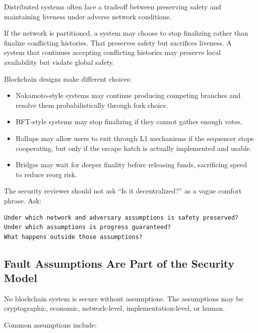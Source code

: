 Distributed systems often face a tradeoff between preserving safety and
maintaining liveness under adverse network conditions.

If the network is partitioned, a system may choose to stop finalizing
rather than finalize conflicting histories. That preserves safety but
sacrifices liveness. A system that continues accepting conflicting
histories may preserve local availability but violate global safety.

Blockchain designs make different choices:

\begin{itemize}
\tightlist
\item
  Nakamoto-style systems may continue producing competing branches and
  resolve them probabilistically through fork choice.
\item
  BFT-style systems may stop finalizing if they cannot gather enough
  votes.
\item
  Rollups may allow users to exit through L1 mechanisms if the sequencer
  stops cooperating, but only if the escape hatch is actually
  implemented and usable.
\item
  Bridges may wait for deeper finality before releasing funds,
  sacrificing speed to reduce reorg risk.
\end{itemize}

The security reviewer should not ask ``Is it decentralized?'' as a vague
comfort phrase. Ask:

\begin{lstlisting}
Under which network and adversary assumptions is safety preserved?
Under which assumptions is progress guaranteed?
What happens outside those assumptions?
\end{lstlisting}

\subsection{Fault Assumptions Are Part of the Security Model}

No blockchain system is secure without assumptions. The assumptions may
be cryptographic, economic, network-level, implementation-level, or
human.

Common assumptions include:

